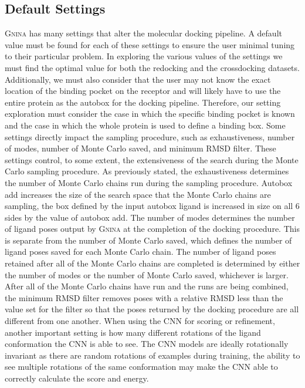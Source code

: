 \documentclass[journal=jcisd8,manuscript=article]{achemso}
\begin{document}
\subsection{Default Settings}
\textsc{Gnina} has many settings that alter the molecular docking pipeline. A default value must be found for each of these settings to ensure the user minimal tuning to their particular problem. In exploring the various values of the settings we must find the optimal value for both the redocking and the crossdocking datasets. Additionally, we must also consider that the user may not know the exact location of the binding pocket on the receptor and will likely have to use the entire protein as the autobox for the docking pipeline. Therefore, our setting exploration must consider the case in which the specific binding pocket is known and the case in which the whole protein is used to define a binding box. Some settings directly impact the sampling procedure, such as exhaustiveness, number of modes, number of Monte Carlo saved, and minimum RMSD filter. These settings control, to some extent, the extensiveness of the search during the Monte Carlo sampling procedure. As previously stated, the exhaustiveness determines the number of Monte Carlo chains run during the sampling procedure. Autobox add increases the size of the search space that the Monte Carlo chains are sampling, the box defined by the input autobox ligand is increased in size on all 6 sides by the value of autobox add. The number of modes determines the number of ligand poses output by \textsc{Gnina} at the completion of the docking procedure. This is separate from the number of Monte Carlo saved, which defines the number of  ligand poses saved for each Monte Carlo chain. The number of ligand poses retained after all of the Monte Carlo chains are completed is determined by either the number of modes or the number of Monte Carlo saved, whichever is larger. After all of the Monte Carlo chains have run and the runs are being combined, the minimum RMSD filter removes poses with a relative RMSD less than the value set for the filter so that the poses returned by the docking procedure are all different from one another. When using the CNN for scoring or refinement, another important setting is how many different rotations of the ligand conformation the CNN is able to see. The CNN models are ideally rotationally invariant as there are random rotations of examples during training, the ability to see multiple rotations of the same conformation may make the CNN able to correctly calculate the score and energy.
\end{document}
